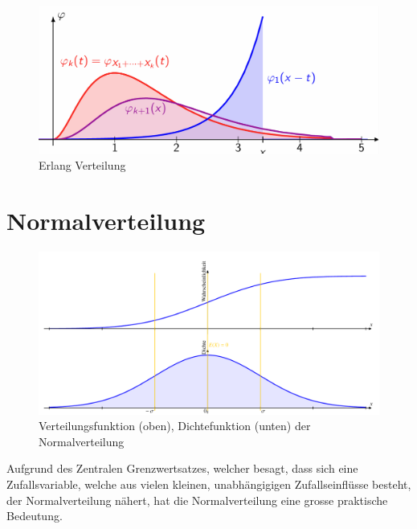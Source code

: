 \documentclass[../Main.tex]{subfiles}
\begin{document}
\begin{figure}[H]
    \centering
    \includegraphics[width=0.75\linewidth]{Images/erlang.png}
    \caption{Erlang Verteilung}
\end{figure}


\newpage

\section{Normalverteilung}


\begin{figure}[H]
    \centering
    \includegraphics[width=0.75\linewidth]{Images/normal-dichte-verteil}
    \caption{Verteilungsfunktion (oben), Dichtefunktion (unten) der Normalverteilung}
\end{figure}

Aufgrund des Zentralen Grenzwertsatzes, welcher besagt,
dass sich eine Zufallsvariable, welche aus vielen kleinen,
unabhängigigen Zufallseinflüsse besteht, der Normalverteilung
nähert, hat die Normalverteilung eine grosse praktische Bedeutung.
\end{document}
